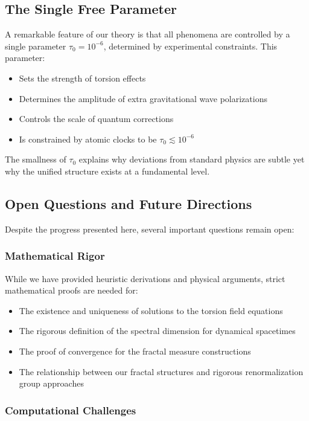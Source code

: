 \subsection{The Single Free Parameter}

A remarkable feature of our theory is that all phenomena are controlled by a single parameter $\tau_0 = 10^{-6}$, determined by experimental constraints. This parameter:

\begin{itemize}
    \item Sets the strength of torsion effects
    \item Determines the amplitude of extra gravitational wave polarizations
    \item Controls the scale of quantum corrections
    \item Is constrained by atomic clocks to be $\tau_0 \lesssim 10^{-6}$
\end{itemize}

The smallness of $\tau_0$ explains why deviations from standard physics are subtle yet why the unified structure exists at a fundamental level.

\subsection{Open Questions and Future Directions}

Despite the progress presented here, several important questions remain open:

\subsubsection{Mathematical Rigor}

While we have provided heuristic derivations and physical arguments, strict mathematical proofs are needed for:
\begin{itemize}
    \item The existence and uniqueness of solutions to the torsion field equations
    \item The rigorous definition of the spectral dimension for dynamical spacetimes
    \item The proof of convergence for the fractal measure constructions
    \item The relationship between our fractal structures and rigorous renormalization group approaches
\end{itemize}

\subsubsection{Computational Challenges}

